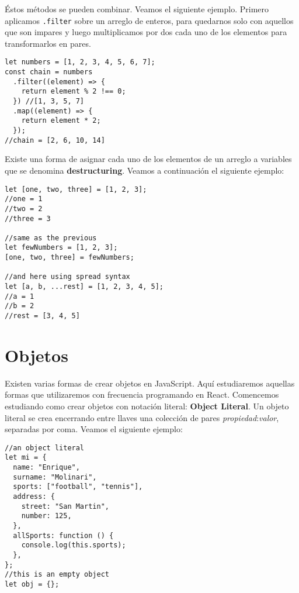 \documentclass[a4paper, oneside, titlepage, 12pt]{book}
\begin{document}
Éstos métodos se pueden combinar. Veamos el siguiente ejemplo. Primero aplicamos \texttt{.filter} sobre un arreglo de enteros, para quedarnos solo con aquellos que son impares y luego multiplicamos por dos cada uno de los elementos para transformarlos en pares. 

\begin{verbatim}
let numbers = [1, 2, 3, 4, 5, 6, 7];
const chain = numbers
  .filter((element) => {
    return element % 2 !== 0;
  }) //[1, 3, 5, 7]
  .map((element) => {
    return element * 2;
  });
//chain = [2, 6, 10, 14]
\end{verbatim}

Existe una forma de asignar cada uno de los elementos de un arreglo a variables que se denomina \textbf{destructuring}. Veamos a continuación el siguiente ejemplo:

\begin{verbatim}
let [one, two, three] = [1, 2, 3];
//one = 1
//two = 2
//three = 3

//same as the previous
let fewNumbers = [1, 2, 3];
[one, two, three] = fewNumbers;

//and here using spread syntax
let [a, b, ...rest] = [1, 2, 3, 4, 5];
//a = 1
//b = 2
//rest = [3, 4, 5]
\end{verbatim}

\section{Objetos}\label{jsobjects}

Existen varias formas de crear objetos en JavaScript. Aquí estudiaremos aquellas formas que utilizaremos con frecuencia programando en React. Comencemos estudiando como crear objetos con notación literal: \textbf{Object Literal}. Un objeto literal se crea encerrando entre llaves una colección de pares \textit{propiedad}:\textit{valor}, separadas por coma. Veamos el siguiente ejemplo: 

\begin{verbatim}
//an object literal
let mi = {
  name: "Enrique",
  surname: "Molinari",
  sports: ["football", "tennis"],
  address: {
    street: "San Martin",
    number: 125,
  },
  allSports: function () {
    console.log(this.sports);
  },
};
//this is an empty object
let obj = {};
\end{verbatim}
\end{document}
